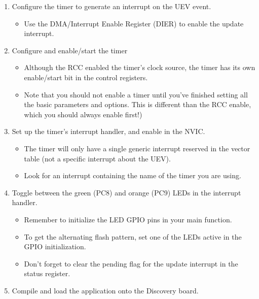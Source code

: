 \documentclass[openany,11pt,fleqn]{book} %
\begin{document}
\begin{exercise}
\begin{enumerate}
            \item Configure the timer to generate an interrupt on the UEV event.     
                \begin{itemize}
                    \item Use the DMA/Interrupt Enable Register (DIER) to enable the update interrupt. 
                \end{itemize}
             \item Configure and enable/start the timer
             \begin{itemize}
                 \item Although the RCC enabled the timer's clock source, the timer has its own enable/start bit in the control registers. 
                 \item Note that you should not enable a timer until you've finished setting all the basic parameters and options. This is different than the RCC enable, which you should always enable first!)
             \end{itemize}
             \item Set up the timer's interrupt handler, and enable in the NVIC.
             \begin{itemize}
                \item The timer will only have a single generic interrupt reserved in the vector table (not a specific interrupt about the UEV). 
                \item Look for an interrupt containing the name of the timer you are using. 
            \end{itemize}
            \item Toggle between the green (PC8) and orange (PC9) LEDs in the interrupt handler. 
            \begin{itemize}
                \item Remember to initialize the LED GPIO pins in your main function. 
                \item To get the alternating flash pattern, set one of the LEDs active in the GPIO initialization.
                \item Don't forget to clear the pending flag for the update interrupt in the status register. 
            \end{itemize}
            \item Compile and load the application onto the Discovery board.
        \end{enumerate}
        
    \end{exercise}
\end{document}
